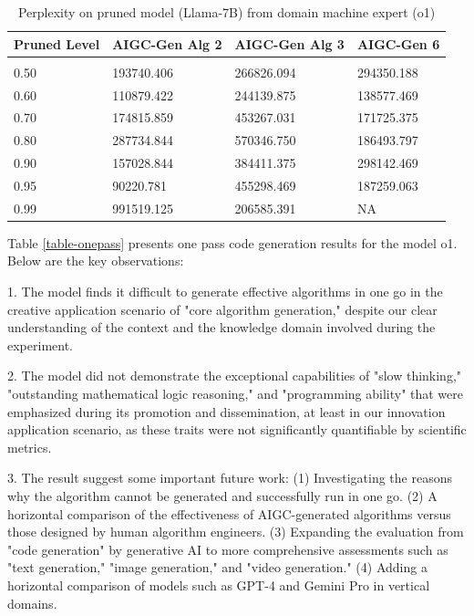 \documentclass{article} %
\begin{document}
\begin{table}[t]
\caption{Perplexity on pruned model (Llama-7B) from domain machine expert (o1)}
\label{table-overall-performance-machine}
\begin{center}
\begin{tabular}{llll}
\multicolumn{1}{c}{\bf Pruned Level}  &\multicolumn{1}{c}{\bf AIGC-Gen Alg 2} & \multicolumn{1}{c}{\bf AIGC-Gen Alg 3} & \multicolumn{1}{c}{\bf AIGC-Gen 6} \\
\hline \\
0.50         &193740.406 & 266826.094 & 294350.188 \\
0.60         &110879.422 & 244139.875 & 138577.469 \\
0.70         &174815.859 & 453267.031 & 171725.375 \\
0.80         &287734.844 & 570346.750 & 186493.797 \\
0.90         &157028.844 & 384411.375 & 298142.469 \\
0.95         &90220.781  & 455298.469 & 187259.063 \\
0.99         &991519.125 & 206585.391 & NA \\
\end{tabular}
\end{center}
\end{table}

Table \ref{table-onepass} presents one pass code generation results for the model o1. Below are the key observations:

1. The model finds it difficult to generate effective algorithms in one go in the creative application scenario of "core algorithm generation," despite our clear understanding of the context and the knowledge domain involved during the experiment.

2. The model did not demonstrate the exceptional capabilities of "slow thinking," "outstanding mathematical logic reasoning," and "programming ability" that were emphasized during its promotion and dissemination, at least in our innovation application scenario, as these traits were not significantly quantifiable by scientific metrics.

3. The result suggest some important future work: (1) Investigating the reasons why the algorithm cannot be generated and successfully run in one go. (2) A horizontal comparison of the effectiveness of AIGC-generated algorithms versus those designed by human algorithm engineers. (3) Expanding the evaluation from "code generation" by generative AI to more comprehensive assessments such as "text generation," "image generation," and "video generation." (4) Adding a horizontal comparison of models such as GPT-4 and Gemini Pro in vertical domains.
\end{document}
